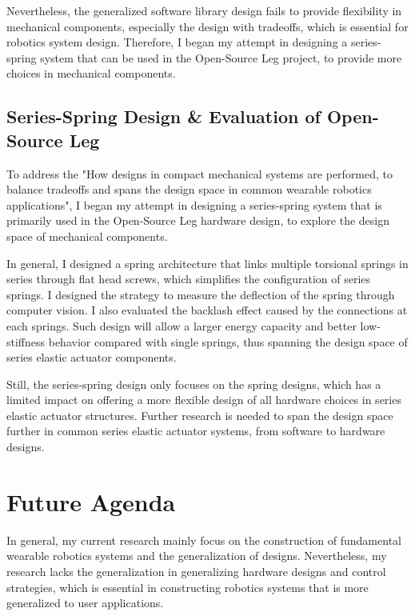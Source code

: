\documentclass[8pt]{article}
\begin{document}
    Nevertheless, the generalized software library design fails to provide flexibility in mechanical components, especially the design with tradeoffs, which is essential for robotics system design. Therefore, I began my attempt in designing a series-spring system that can be used in the Open-Source Leg project, to provide more choices in mechanical components.

    
    \subsection{Series-Spring Design \& Evaluation of Open-Source Leg}  \label{sec:series-spring}

    
    To address the "How designs in compact mechanical systems are performed, to balance tradeoffs and spans the design space in common wearable robotics applications", I began my attempt in designing a series-spring system that is primarily used in the Open-Source Leg hardware design, to explore the design space of mechanical components.

    In general, I designed a spring architecture that links multiple torsional springs in series through flat head screws, which simplifies the configuration of series springs. I designed the strategy to measure the deflection of the spring through computer vision. I also evaluated the backlash effect caused by the connections at each springs. Such design will allow a larger energy capacity and better low-stiffness behavior compared with single springs, thus spanning the design space of series elastic actuator components. 

    Still, the series-spring design only focuses on the spring designs, which has a limited impact on offering a more flexible design of all hardware choices in series elastic actuator structures. Further research is needed to span the design space further in common series elastic actuator systems, from software to hardware designs.
    

    

\section{Future Agenda} \label{sec:Agenda}

In general, my current research mainly focus on the construction of fundamental wearable robotics systems and the generalization of designs. Nevertheless, my research lacks the generalization in generalizing hardware designs and control strategies, which is essential in constructing robotics systems that is more generalized to user applications. 
\end{document}
